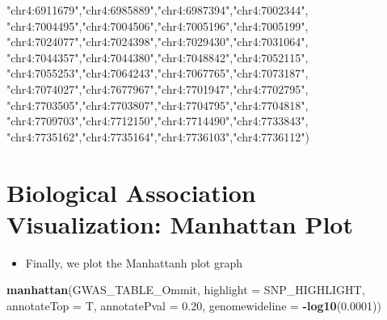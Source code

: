\documentclass[
]{book}
\newenvironment{Shaded}{\begin{snugshade}}{\end{snugshade}}
\newcommand{\AttributeTok}[1]{\textcolor[rgb]{0.13,0.29,0.53}{#1}}
\newcommand{\FloatTok}[1]{\textcolor[rgb]{0.00,0.00,0.81}{#1}}
\newcommand{\FunctionTok}[1]{\textcolor[rgb]{0.13,0.29,0.53}{\textbf{#1}}}
\newcommand{\NormalTok}[1]{#1}
\newcommand{\SpecialCharTok}[1]{\textcolor[rgb]{0.81,0.36,0.00}{\textbf{#1}}}
\newcommand{\StringTok}[1]{\textcolor[rgb]{0.31,0.60,0.02}{#1}}
\providecommand{\tightlist}{%
  \setlength{\itemsep}{0pt}\setlength{\parskip}{0pt}}
\begin{document}
\begin{Shaded}
\begin{Highlighting}[]
                   \StringTok{"chr4:6911679"}\NormalTok{,}\StringTok{"chr4:6985889"}\NormalTok{,}\StringTok{"chr4:6987394"}\NormalTok{,}\StringTok{"chr4:7002344"}\NormalTok{,}
                   \StringTok{"chr4:7004495"}\NormalTok{,}\StringTok{"chr4:7004506"}\NormalTok{,}\StringTok{"chr4:7005196"}\NormalTok{,}\StringTok{"chr4:7005199"}\NormalTok{,}
                   \StringTok{"chr4:7024077"}\NormalTok{,}\StringTok{"chr4:7024398"}\NormalTok{,}\StringTok{"chr4:7029430"}\NormalTok{,}\StringTok{"chr4:7031064"}\NormalTok{,}
                   \StringTok{"chr4:7044357"}\NormalTok{,}\StringTok{"chr4:7044380"}\NormalTok{,}\StringTok{"chr4:7048842"}\NormalTok{,}\StringTok{"chr4:7052115"}\NormalTok{,}
                   \StringTok{"chr4:7055253"}\NormalTok{,}\StringTok{"chr4:7064243"}\NormalTok{,}\StringTok{"chr4:7067765"}\NormalTok{,}\StringTok{"chr4:7073187"}\NormalTok{,}
                   \StringTok{"chr4:7074027"}\NormalTok{,}\StringTok{"chr4:7677967"}\NormalTok{,}\StringTok{"chr4:7701947"}\NormalTok{,}\StringTok{"chr4:7702795"}\NormalTok{,}
                   \StringTok{"chr4:7703505"}\NormalTok{,}\StringTok{"chr4:7703807"}\NormalTok{,}\StringTok{"chr4:7704795"}\NormalTok{,}\StringTok{"chr4:7704818"}\NormalTok{,}
                   \StringTok{"chr4:7709703"}\NormalTok{,}\StringTok{"chr4:7712150"}\NormalTok{,}\StringTok{"chr4:7714490"}\NormalTok{,}\StringTok{"chr4:7733843"}\NormalTok{,}
                   \StringTok{"chr4:7735162"}\NormalTok{,}\StringTok{"chr4:7735164"}\NormalTok{,}\StringTok{"chr4:7736103"}\NormalTok{,}\StringTok{"chr4:7736112"}\NormalTok{)}
\end{Highlighting}
\end{Shaded}

\section{Biological Association Visualization: Manhattan Plot}\label{biological-association-visualization-manhattan-plot}

\begin{itemize}
\tightlist
\item
  Finally, we plot the Manhattanh plot graph
\end{itemize}

\begin{Shaded}
\begin{Highlighting}[]
\FunctionTok{manhattan}\NormalTok{(GWAS\_TABLE\_Ommit, }
          \AttributeTok{highlight =}\NormalTok{ SNP\_HIGHLIGHT, }
          \AttributeTok{annotateTop =}\NormalTok{ T, }
          \AttributeTok{annotatePval =} \FloatTok{0.20}\NormalTok{, }
          \AttributeTok{genomewideline =} \SpecialCharTok{{-}}\FunctionTok{log10}\NormalTok{(}\FloatTok{0.0001}\NormalTok{))}
\end{Highlighting}
\end{Shaded}
\end{document}
